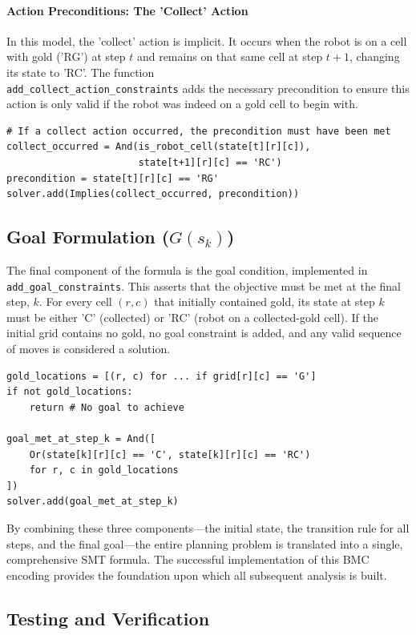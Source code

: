 \documentclass[12pt, a4paper, oneside]{report} %
\begin{document}
\paragraph{Action Preconditions: The 'Collect' Action}
In this model, the 'collect' action is implicit. It occurs when the robot is on a cell with gold ('RG') at step $t$ and remains on that same cell at step $t+1$, changing its state to 'RC'. The function \\ \texttt{add\_collect\_action\_constraints} adds the necessary precondition to ensure this action is only valid if the robot was indeed on a gold cell to begin with.
\begin{verbatim}
# If a collect action occurred, the precondition must have been met
collect_occurred = And(is_robot_cell(state[t][r][c]), 
                       state[t+1][r][c] == 'RC')
precondition = state[t][r][c] == 'RG'
solver.add(Implies(collect_occurred, precondition))
\end{verbatim}

\subsection{Goal Formulation ($G(s_k)$)}
The final component of the formula is the goal condition, implemented in \texttt{add\_goal\_constraints}. This asserts that the objective must be met at the final step, $k$. For every cell $(r, c)$ that initially contained gold, its state at step $k$ must be either 'C' (collected) or 'RC' (robot on a collected-gold cell). If the initial grid contains no gold, no goal constraint is added, and any valid sequence of moves is considered a solution.
\begin{verbatim}
gold_locations = [(r, c) for ... if grid[r][c] == 'G']
if not gold_locations:
    return # No goal to achieve

goal_met_at_step_k = And([
    Or(state[k][r][c] == 'C', state[k][r][c] == 'RC') 
    for r, c in gold_locations
])
solver.add(goal_met_at_step_k)
\end{verbatim}

By combining these three components—the initial state, the transition rule for all steps, and the final goal—the entire planning problem is translated into a single, comprehensive SMT formula. The successful implementation of this BMC encoding provides the foundation upon which all subsequent analysis is built.
\subsection{Testing and Verification}
\end{document}
